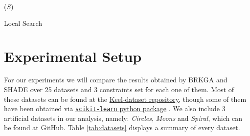 \documentclass[review]{elsarticle}
\begin{document}
\begin{algorithm}
	\SetNlSkip{0.5em}
	\BlankLine
	\BlankLine
	\KwRet ($S$)

\caption{Local Search}\label{alg:LS}
\end{algorithm}

\clearpage

\section{Experimental Setup} \label{sec:expSetup}

For our experiments we will compare the results obtained by BRKGA and SHADE over 25 datasets and 3 constraints set for each one of them. Most of these datasets can be found at the \href{https://sci2s.ugr.es/keel/category.php?cat=clas}{Keel-dataset repository}\cite{triguero2017keel}, though some of them have been obtained via
\href{https://scikit-learn.org/stable/datasets/index.html}{\texttt{scikit-learn} python package} \cite{scikit-learn}. We also include 3 artificial datasets in our analysis, namely: \textit{Circles}, \textit{Moons} and \textit{Spiral}, which can be found at GitHub. Table \ref{tab:datasets} displays a summary of every dataset.
\end{document}
